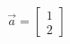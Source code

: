 \documentclass[preview]{standalone}
\begin{document}
\begin{align*}
\vec{a} = \begin{bmatrix} 1 \\ 2 \end{bmatrix}
\end{align*}
\end{document}
